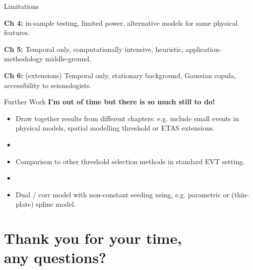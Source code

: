 \documentclass[10pt]{beamer}
\begin{document}
\begin{frame}{Limitations}
    
\textbf{Ch 4:} in-sample testing, limited power, alternative models for same physical features.

\vspace{2em}

\textbf{Ch 5:} Temporal only, computationally intensive, heuristic, application-methodology middle-ground. 

\vspace{2em}

\textbf{Ch 6:} (extensions) Temporal only, stationary background, Gaussian copula, accessibility to seismologists.
\end{frame}



\begin{frame}{Further Work}
 \textbf{I'm out of time but there is so much still to do!}

\begin{itemize}
    \item Draw together results from different chapters: e.g. include small events in physical models, spatial modelling threshold or ETAS extensions. 
    \item [] 
    \item Comparison to other threshold selection methods in standard EVT setting.  
    \item []
    \item Dual / corr model with non-constant seeding using, e.g. parametric or (thin-plate) spline model. 
\end{itemize}
\end{frame}

\section*{Thank you for your time,\\ any questions?}
\end{document}
